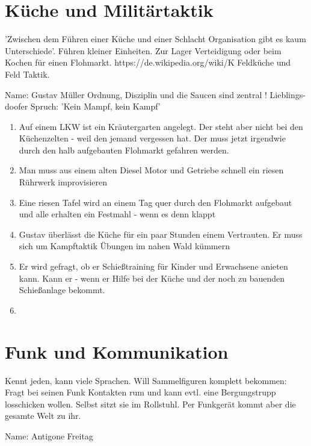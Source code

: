 \section{Küche und Militärtaktik}
'Zwischen dem Führen einer Küche und einer Schlacht Organisation gibt es kaum Unterschiede'. Führen kleiner Einheiten. Zur Lager Verteidigung oder beim Kochen für einen Flohmarkt. https://de.wikipedia.org/wiki/K%
Feldküche und Feld Taktik.

Name: Gustav Müller
Ordnung, Disziplin und die Saucen sind zentral !
Lieblings-doofer Spruch: 'Kein Mampf, kein Kampf'

\begin{enumerate}
\item Auf einem LKW ist ein Kräutergarten angelegt. Der steht aber nicht bei den Küchenzelten - weil den jemand vergessen hat. Der muss jetzt irgendwie durch den halb aufgebauten Flohmarkt gefahren werden.
\item Man muss aus einem alten Diesel Motor und Getriebe schnell ein riesen Rührwerk improvisieren
\item Eine riesen Tafel wird an einem Tag quer durch den Flohmarkt aufgebaut und alle erhalten ein Festmahl - wenn es denn klappt
\item Gustav überlässt die Küche für ein paar Stunden einem Vertrauten. Er muss sich um Kampftaktik Übungen im nahen Wald kümmern
\item Er wird gefragt, ob er Schießtraining für Kinder und Erwachsene anieten kann. Kann er - wenn er Hilfe bei der Küche und der noch zu bauenden Schießanlage bekommt.
\item
\end{enumerate}

\section{Funk und Kommunikation}
Kennt jeden, kann viele Sprachen. Will Sammelfiguren komplett bekommen: Fragt bei seinen Funk Kontakten rum und kann evtl. eine Bergungstrupp losschicken wollen. Selbst sitzt sie im Rollstuhl. Per Funkgerät kommt aber die gesamte Welt zu ihr.

Name: Antigone Freitag

